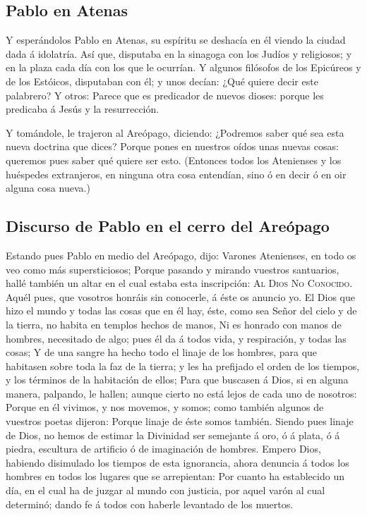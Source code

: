 \hypertarget{pablo-en-atenas}{%
\subsection{Pablo en Atenas}\label{pablo-en-atenas}}

 Y esperándolos Pablo en Atenas, su espíritu se deshacía
en él viendo la ciudad dada á idolatría.  Así que,
disputaba en la sinagoga con los Judíos y religiosos; y en la plaza cada
día con los que le ocurrían.  Y algunos filósofos de los
Epicúreos y de los Estóicos, disputaban con él; y unos decían: ¿Qué
quiere decir este palabrero? Y otros: Parece que es predicador de nuevos
dioses: porque les predicaba á Jesús y la resurrección.

 Y tomándole, le trajeron al Areópago, diciendo:
¿Podremos saber qué sea esta nueva doctrina que dices? 
Porque pones en nuestros oídos unas nuevas cosas: queremos pues saber
qué quiere ser esto.  (Entonces todos los Atenienses y
los huéspedes extranjeros, en ninguna otra cosa entendían, sino ó en
decir ó en oir alguna cosa nueva.)

\hypertarget{discurso-de-pablo-en-el-cerro-del-areuxf3pago}{%
\subsection{Discurso de Pablo en el cerro del
Areópago}\label{discurso-de-pablo-en-el-cerro-del-areuxf3pago}}

 Estando pues Pablo en medio del Areópago, dijo: Varones
Atenienses, en todo os veo como más supersticiosos; 
Porque pasando y mirando vuestros santuarios, hallé también un altar en
el cual estaba esta inscripción: \textsc{Al} \textsc{Dios} \textsc{No}
\textsc{Conocido}. Aquél pues, que vosotros honráis sin conocerle, á
éste os anuncio yo.  El Dios que hizo el mundo y todas
las cosas que en él hay, éste, como sea Señor del cielo y de la tierra,
no habita en templos hechos de manos,  Ni es honrado con
manos de hombres, necesitado de algo; pues él da á todos vida, y
respiración, y todas las cosas;  Y de una sangre ha hecho
todo el linaje de los hombres, para que habitasen sobre toda la faz de
la tierra; y les ha prefijado el orden de los tiempos, y los términos de
la habitación de ellos;  Para que buscasen á Dios, si en
alguna manera, palpando, le hallen; aunque cierto no está lejos de cada
uno de nosotros:  Porque en él vivimos, y nos movemos, y
somos; como también algunos de vuestros poetas dijeron: Porque linaje de
éste somos también.  Siendo pues linaje de Dios, no hemos
de estimar la Divinidad ser semejante á oro, ó á plata, ó á piedra,
escultura de artificio ó de imaginación de hombres. 
Empero Dios, habiendo disimulado los tiempos de esta ignorancia, ahora
denuncia á todos los hombres en todos los lugares que se arrepientan:
 Por cuanto ha establecido un día, en el cual ha de
juzgar al mundo con justicia, por aquel varón al cual determinó; dando
fe á todos con haberle levantado de los muertos.

